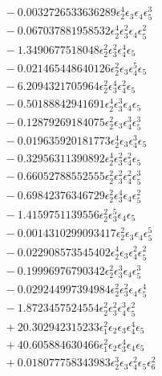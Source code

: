\documentclass[10pt]{article}
\begin{document}
\begin{align*}
&{}  - 0.0032726533636289 \epsilon_{2}^{4} \epsilon_{3} \epsilon_{4} \epsilon_{5}^{3} \\
&{}  - 0.067037881958532 \epsilon_{2}^{4} \epsilon_{3}^{2} \epsilon_{4} \epsilon_{5}^{2} \\
&{}  - 1.3490677518048 \epsilon_{2}^{2} \epsilon_{3}^{2} \epsilon_{4}^{4} \epsilon_{5} \\
&{}  - 0.021465448640126 \epsilon_{2}^{2} \epsilon_{3} \epsilon_{4}^{5} \epsilon_{5} \\
&{}  - 6.2094321705964 \epsilon_{2}^{2} \epsilon_{3}^{4} \epsilon_{4}^{2} \epsilon_{5} \\
&{}  - 0.50188842941691 \epsilon_{2}^{4} \epsilon_{3}^{3} \epsilon_{4} \epsilon_{5} \\
&{}  - 0.12879269184075 \epsilon_{2}^{2} \epsilon_{3} \epsilon_{4}^{3} \epsilon_{5}^{3} \\
&{}  - 0.019635920181773 \epsilon_{2}^{4} \epsilon_{3} \epsilon_{4}^{3} \epsilon_{5} \\
&{}  - 0.32956311390892 \epsilon_{2}^{4} \epsilon_{3}^{2} \epsilon_{4}^{2} \epsilon_{5} \\
&{}  - 0.66052788552555 \epsilon_{2}^{2} \epsilon_{3}^{2} \epsilon_{4}^{2} \epsilon_{5}^{3} \\
&{}  - 0.69842376346729 \epsilon_{2}^{2} \epsilon_{3}^{4} \epsilon_{4} \epsilon_{5}^{2} \\
&{}  - 1.4159751139556 \epsilon_{2}^{2} \epsilon_{3}^{5} \epsilon_{4} \epsilon_{5} \\
&{}  - 0.0014310299093417 \epsilon_{2}^{2} \epsilon_{3} \epsilon_{4} \epsilon_{5}^{5} \\
&{}  - 0.022908573545402 \epsilon_{2}^{4} \epsilon_{3} \epsilon_{4}^{2} \epsilon_{5}^{2} \\
&{}  - 0.19996976790342 \epsilon_{2}^{2} \epsilon_{3}^{3} \epsilon_{4} \epsilon_{5}^{3} \\
&{}  - 0.029244997394984 \epsilon_{2}^{2} \epsilon_{3}^{2} \epsilon_{4} \epsilon_{5}^{4} \\
&{}  - 1.8723457524554 \epsilon_{2}^{2} \epsilon_{3}^{2} \epsilon_{4}^{3} \epsilon_{5}^{2} \\
&{}  + 20.302942315233 \epsilon_{1}^{2} \epsilon_{2} \epsilon_{3} \epsilon_{4}^{4} \epsilon_{5} \\
&{}  + 40.605884630466 \epsilon_{1}^{2} \epsilon_{2} \epsilon_{3}^{4} \epsilon_{4} \epsilon_{5} \\
&{}  + 0.018077758343983 \epsilon_{2}^{3} \epsilon_{3} \epsilon_{4}^{2} \epsilon_{5} \epsilon_{6}^{2} \\

\end{align*}
\end{document}
